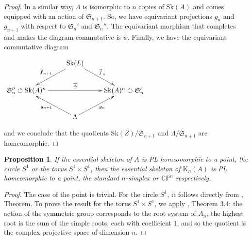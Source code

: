 \documentclass{amsart}%
\numberwithin{equation}{subsection}
\theoremstyle{plain2}
\newtheorem{prop}[equation]{Proposition}
\theoremstyle{definition2}
\theoremstyle{stepstyle}
\theoremstyle{point}
\theoremstyle{subpoint}
\newcommand{\CP}{\ensuremath{\mathbb{CP}}}
\newcommand{\Sk}{\mathrm{Sk}}
\begin{document}
\begin{proof}
In a similar way, $\Lambda$ is isomorphic to $n$ copies of $\Sk(A)$ and comes equipped with an action of $\mathfrak{S}_{n+1}$. So, we have equivariant projections $g_n$ and $g_{n+1}$ with respect to $\mathfrak{S}_n'$ and $\mathfrak{S}_n''$. The equivariant morphism that completes and makes the diagram commutative is $\overline{\psi}$. Finally, we have the equivariant commutative diagram
\begin{center}
\xymatrixrowsep{1pc}
\xymatrixrowsep{1pc}
$\xymatrix{
& \Sk(L)  \ar[ld]_{\overline{f}_{n+1}} \ar[rd]^{\overline{f}_{n}}  &\\
\mathfrak{S}_n'' \circlearrowleft\Sk(A)^n  \ar[rr]^{\overline{\psi}}& & \Sk(A)^n\circlearrowright \mathfrak{S}_n' \\
& \Lambda\ar[lu]^{g_{n+1}}\ar[ru]_{g_n} &
}$
\end{center} and we conclude that the quotients $\Sk(Z)/\mathfrak{S}_{n+1}$ and $\Lambda/\mathfrak{S}_{n+1}$ are homeomorphic.
\end{proof}

\begin{prop} \label{prop top essential skeleton Kummer}
If the essential skeleton of $A$ is PL homeomorphic to a point, the circle $S^1$ or the torus $S^1 \times S^1$, then the essential skeleton of $\text{K}_n(A)$ is PL homeomorphic to a point, the standard $n$-simplex or $\CP^n$ respectively. 
\end{prop}
\begin{proof}
The case of the point is trivial. For the circle $S^1$, it follows directly from \cite{Morton}, Theorem. To prove the result for the torus $S^1 \times S^1$, we apply \cite{Looijenga}, Theorem 3.4: the action of the symmetric group corresponds to the root system of $A_n$, the highest root is the sum of the simple roots, each with coefficient $1$, and so the quotient is the complex projective space of dimension $n$.
\end{proof}
\end{document}
